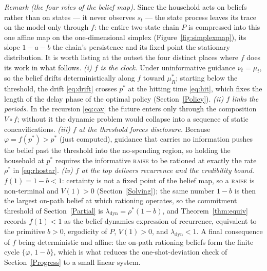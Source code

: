 \documentclass[12pt]{article}
\begin{document}
\noindent\emph{Remark (the four roles of the belief map).} Since the household acts on beliefs rather than on states --- it never observes $s_t$ --- the state process leaves its trace on the model only through $f$: the entire two-state chain $P$ is compressed into this one affine map on the one-dimensional simplex (Figure~\ref{fig:simplexmap}), its slope $1-a-b$ the chain's persistence and its fixed point the stationary distribution. It is worth listing at the outset the four distinct places where $f$ does its work in what follows. \emph{(i) $f$ is the clock.} Under uninformative guidance $\nu_t=\mu_t$, so the belief drifts deterministically along $f$ toward $\mu_R^*$; starting below the threshold, the drift \eqref{eq:drift} crosses $p^*$ at the hitting time \eqref{eq:hit}, which fixes the length of the delay phase of the optimal policy (Section~\ref{Policy}). \emph{(ii) $f$ links the periods.} In the recursion \eqref{eq:cav} the future enters only through the composition $V\circ f$; without it the dynamic problem would collapse into a sequence of static concavifications. \emph{(iii) $f$ at the threshold forces disclosure.} Because $\varphi = f(p^*)>p^*$ (just computed), guidance that carries no information pushes the belief past the threshold into the no-spending region, so holding the household at $p^*$ requires the informative \textsc{raise} to be rationed at exactly the rate $\rho^*$ in \eqref{eq:rhostar}. \emph{(iv) $f$ at the top delivers recurrence and the credibility bound.} $f(1)=1-b<1$: certainty is not a fixed point of the belief map, so a \textsc{raise} is non-terminal and $V(1)>0$ (Section~\ref{Solving}); the same number $1-b$ is then the largest on-path belief at which rationing operates, so the commitment threshold of Section~\ref{Partial} is $\lambda_{\mathrm{dyn}} = \rho^*(1-b)$, and Theorem~\ref{thm:equiv} records $f(1)<1$ as the belief-dynamics expression of recurrence, equivalent to the primitive $b>0$, ergodicity of $P$, $V(1)>0$, and $\lambda_{\mathrm{dyn}}<1$. A final consequence of $f$ being deterministic and affine: the on-path rationing beliefs form the finite cycle $\{\varphi,\,1-b\}$, which is what reduces the one-shot-deviation check of Section~\ref{Progress} to a small linear system.
\end{document}
